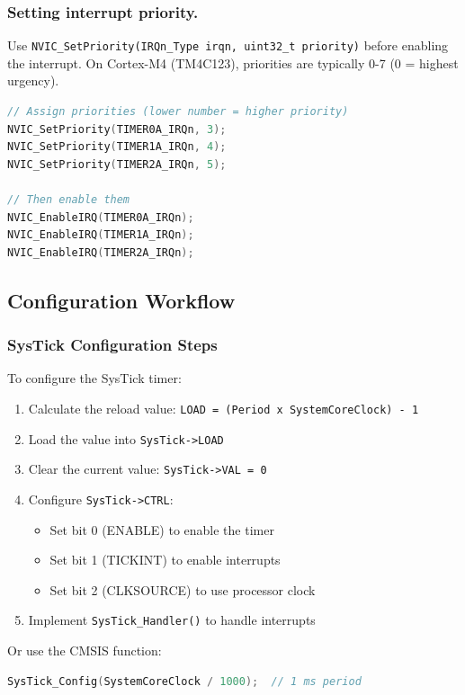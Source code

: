 \subsubsection*{Setting interrupt priority.}
Use \texttt{NVIC\_SetPriority(IRQn\_Type irqn, uint32\_t priority)} before enabling the interrupt. 
On Cortex-M4 (TM4C123), priorities are typically 0-7 (0 = highest urgency).
\begin{lstlisting}[language=C]
// Assign priorities (lower number = higher priority)
NVIC_SetPriority(TIMER0A_IRQn, 3);
NVIC_SetPriority(TIMER1A_IRQn, 4);
NVIC_SetPriority(TIMER2A_IRQn, 5);

// Then enable them
NVIC_EnableIRQ(TIMER0A_IRQn);
NVIC_EnableIRQ(TIMER1A_IRQn);
NVIC_EnableIRQ(TIMER2A_IRQn);
\end{lstlisting}




\subsection{Configuration Workflow}

\subsubsection{SysTick Configuration Steps}

To configure the SysTick timer:

\begin{enumerate}[nosep]
  \item Calculate the reload value: \texttt{LOAD = (Period x SystemCoreClock) - 1}
  \item Load the value into \texttt{SysTick->LOAD}
  \item Clear the current value: \texttt{SysTick->VAL = 0}
  \item Configure \texttt{SysTick->CTRL}:
    \begin{itemize}[nosep]
      \item Set bit 0 (ENABLE) to enable the timer
      \item Set bit 1 (TICKINT) to enable interrupts
      \item Set bit 2 (CLKSOURCE) to use processor clock
    \end{itemize}
  \item Implement \texttt{SysTick\_Handler()} to handle interrupts
\end{enumerate}

\noindent
Or use the CMSIS function:
\begin{lstlisting}[language=C]
SysTick_Config(SystemCoreClock / 1000);  // 1 ms period
\end{lstlisting}

